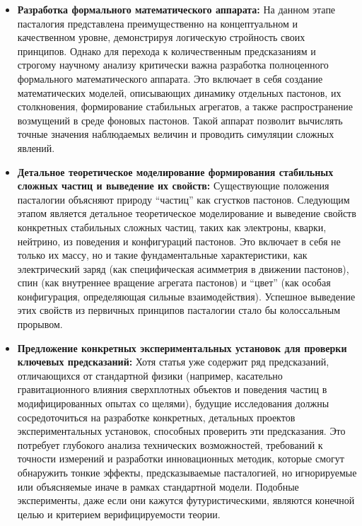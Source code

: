 \documentclass[pdflatex,sn-mathphys-num]{sn-jnl}
\begin{document}
\begin{itemize}
    \item \textbf{Разработка формального математического аппарата:} На данном этапе пасталогия представлена преимущественно на концептуальном и качественном уровне, демонстрируя логическую стройность своих принципов. Однако для перехода к количественным предсказаниям и строгому научному анализу критически важна разработка полноценного формального математического аппарата. Это включает в себя создание математических моделей, описывающих динамику отдельных пастонов, их столкновения, формирование стабильных агрегатов, а также распространение возмущений в среде фоновых пастонов. Такой аппарат позволит вычислять точные значения наблюдаемых величин и проводить симуляции сложных явлений.
    
    \item \textbf{Детальное теоретическое моделирование формирования стабильных сложных частиц и выведение их свойств:} Существующие положения пасталогии объясняют природу ``частиц'' как сгустков пастонов. Следующим этапом является детальное теоретическое моделирование и выведение свойств конкретных стабильных сложных частиц, таких как электроны, кварки, нейтрино, из поведения и конфигураций пастонов. Это включает в себя не только их массу, но и такие фундаментальные характеристики, как электрический заряд (как специфическая асимметрия в движении пастонов), спин (как внутреннее вращение агрегата пастонов) и ``цвет'' (как особая конфигурация, определяющая сильные взаимодействия). Успешное выведение этих свойств из первичных принципов пасталогии стало бы колоссальным прорывом.
    
    \item \textbf{Предложение конкретных экспериментальных установок для проверки ключевых предсказаний:} Хотя статья уже содержит ряд предсказаний, отличающихся от стандартной физики (например, касательно гравитационного влияния сверхплотных объектов и поведения частиц в модифицированных опытах со щелями), будущие исследования должны сосредоточиться на разработке конкретных, детальных проектов экспериментальных установок, способных проверить эти предсказания. Это потребует глубокого анализа технических возможностей, требований к точности измерений и разработки инновационных методик, которые смогут обнаружить тонкие эффекты, предсказываемые пасталогией, но игнорируемые или объясняемые иначе в рамках стандартной модели. Подобные эксперименты, даже если они кажутся футуристическими, являются конечной целью и критерием верифицируемости теории.
\end{itemize}
\end{document}
